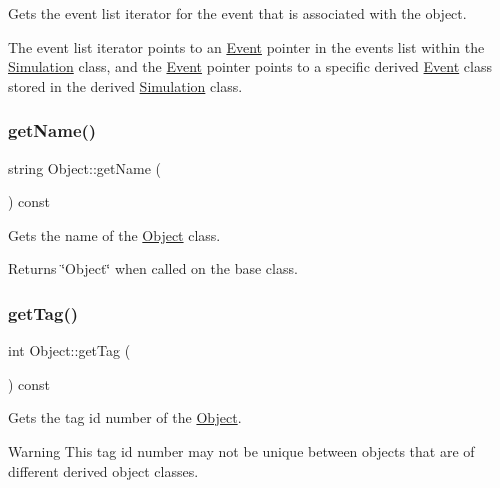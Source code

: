 Gets the event list iterator for the event that is associated with the object. 

The event list iterator points to an \hyperlink{class_event}{Event} pointer in the events list within the \hyperlink{class_simulation}{Simulation} class, and the \hyperlink{class_event}{Event} pointer points to a specific derived \hyperlink{class_event}{Event} class stored in the derived \hyperlink{class_simulation}{Simulation} class. \mbox{\label{class_object_ade517616d51cd9ab581ec5afeb37b313}} 
\subsubsection{\texorpdfstring{get\+Name()}{getName()}}
{\footnotesize\ttfamily string Object\+::get\+Name (\begin{DoxyParamCaption}{ }\end{DoxyParamCaption}) const\hspace{0.3cm}{\ttfamily [virtual]}}



Gets the name of the \hyperlink{class_object}{Object} class. 

\begin{DoxyReturn}{Returns}
\char`\"{}\+Object\char`\"{} when called on the base class. 
\end{DoxyReturn}
\mbox{\label{class_object_aa9653577e8d0ac4b7b86d23d12f8b31b}} 
\subsubsection{\texorpdfstring{get\+Tag()}{getTag()}}
{\footnotesize\ttfamily int Object\+::get\+Tag (\begin{DoxyParamCaption}{ }\end{DoxyParamCaption}) const}



Gets the tag id number of the \hyperlink{class_object}{Object}. 

\begin{DoxyWarning}{Warning}
This tag id number may not be unique between objects that are of different derived object classes. 
\end{DoxyWarning}
\mbox{\label{class_object_a3d7c877f4aa179d9a56050c5faddc18d}} 

